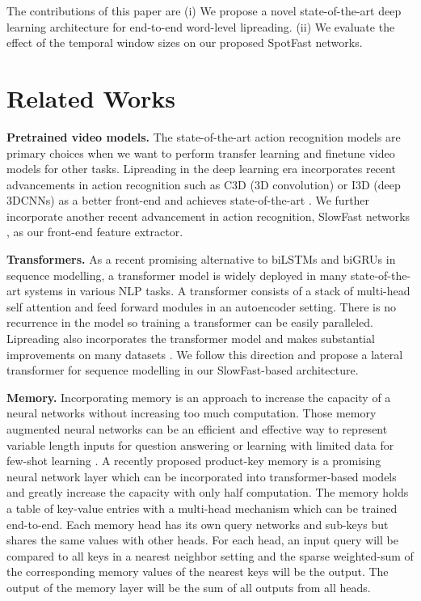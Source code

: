 \documentclass{article}
\begin{document}
The contributions of this paper are (i) We propose a novel state-of-the-art deep learning architecture for end-to-end word-level lipreading. (ii) We evaluate the effect of the temporal window sizes on our proposed SpotFast networks.  \section{Related Works}
\textbf{Pretrained video models.} The state-of-the-art action recognition models are primary choices when we want to perform transfer learning and finetune video models for other tasks. Lipreading in the deep learning era incorporates recent advancements in action recognition such as C3D (3D convolution) \cite{tran2015learning} or I3D (deep 3DCNNs) \cite{carreira2017quo} as a better front-end and achieves state-of-the-art \cite{stafylakis2017combining, weng2019learning}. We further incorporate another recent advancement in action recognition, SlowFast networks \cite{feichtenhofer2019slowfast}, as our front-end feature extractor. 

\hspace{-1.2\baselineskip}\textbf{Transformers.} As a recent promising alternative to biLSTMs and biGRUs in sequence modelling, a transformer model \cite{vaswani2017attention} is widely deployed in many state-of-the-art systems in various NLP tasks. A transformer consists of a stack of multi-head self attention and feed forward modules in an autoencoder setting. There is no recurrence in the model so training a transformer can be easily paralleled. Lipreading also incorporates the transformer model and makes substantial improvements on many datasets \cite{afouras2018deep, Zhang_2019_ICCV}. We follow this direction and propose a lateral transformer for sequence modelling in our SlowFast-based architecture.

\hspace{-1.2\baselineskip}\textbf{Memory.} Incorporating memory is an approach to increase the capacity of a neural networks without increasing too much computation. Those memory augmented neural networks can be an efficient and effective way to represent variable length inputs for question answering \cite{weston2014memory, sukhbaatar2015end} or learning with limited data for few-shot learning \cite{santoro2016meta, zhu2018compound}. 
A recently proposed product-key memory \cite{lample2019large} is a promising neural network layer which can be incorporated into transformer-based models and greatly increase the capacity with only half computation. The memory holds a table of key-value entries with a multi-head mechanism which can be trained end-to-end. Each memory head has its own query networks and sub-keys but shares the same values with other heads. For each head, an input query will be compared to all keys in a nearest neighbor setting and the sparse weighted-sum of the corresponding memory values of the  nearest keys will be the output. The output of the memory layer will be the sum of all outputs from all heads.
\end{document}
